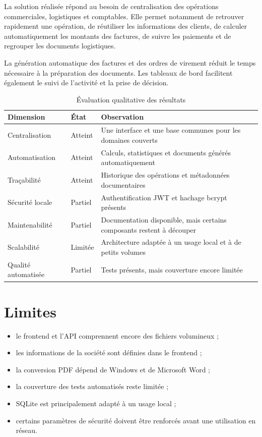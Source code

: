 \documentclass[12pt,a4paper,oneside]{report}
\begin{document}
La solution réalisée répond au besoin de centralisation des opérations
commerciales, logistiques et comptables. Elle permet notamment de
retrouver rapidement une opération, de réutiliser les informations des
clients, de calculer automatiquement les montants des factures, de suivre
les paiements et de regrouper les documents logistiques.

La génération automatique des factures et des ordres de virement réduit
le temps nécessaire à la préparation des documents. Les tableaux de bord
facilitent également le suivi de l'activité et la prise de décision.

\begin{table}[H]
\centering
\caption{Évaluation qualitative des résultats}
\begin{tabularx}{\textwidth}{Y p{3cm}Y}
\toprule
\textbf{Dimension} & \textbf{État} & \textbf{Observation}\\
\midrule
Centralisation
& Atteint
& Une interface et une base communes pour les domaines couverts\\

Automatisation
& Atteint
& Calculs, statistiques et documents générés automatiquement\\

Traçabilité
& Atteint
& Historique des opérations et métadonnées documentaires\\

Sécurité locale
& Partiel
& Authentification JWT et hachage bcrypt présents\\

Maintenabilité
& Partiel
& Documentation disponible, mais certains composants restent à découper\\

Scalabilité
& Limitée
& Architecture adaptée à un usage local et à de petits volumes\\

Qualité automatisée
& Partiel
& Tests présents, mais couverture encore limitée\\
\bottomrule
\end{tabularx}
\end{table}

\section{Limites}

\begin{itemize}
  \item le frontend et l'API comprennent encore des fichiers volumineux ;
  \item les informations de la société sont définies dans le frontend ;
  \item la conversion PDF dépend de Windows et de Microsoft Word ;
  \item la couverture des tests automatisés reste limitée ;
  \item SQLite est principalement adapté à un usage local ;
  \item certains paramètres de sécurité doivent être renforcés avant
        une utilisation en réseau.
\end{itemize}
\end{document}
